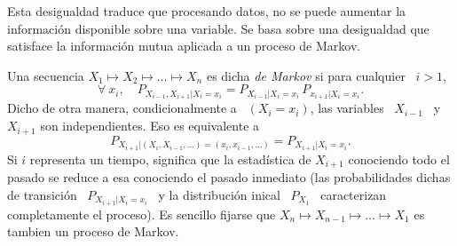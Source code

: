 \label{Sec:SZ:Desigualdades}




\label{Ssec:SZ:ProcDatosShannon}

Esta  desigualdad  traduce  que  procesando  datos,  no  se  puede  aumentar  la
informaci\'on disponible sobre  una variable. Se basa sobre  una desigualdad que
satisface la informaci\'on mutua aplicada a un proceso de Markov.

\begin{definicion}
\label{Def:SZ:ProcesoMarkov}
%
  Una secuencia  $X_1 \mapsto X_2 \mapsto  \ldots \mapsto X_n$ es  dicha {\it de
    Markov}   si   para  cualquier \   $i   >   1$,
  \[
  \forall \: x_i, \quad P_{X_{i-1},X_{i+1}|X_i=x_i} = P_{X_{i-1}|X_i=x_i} \, P_{x_{i+1}|X_i=x_i}.
  \]
  Dicho  de otra  manera,  condicionalmente  a \  $(X_i=x_i)$,  las variables  \
  $X_{i-1}$ \ y \ $X_{i+1}$ son independientes.  Eso es equivalente a
  \[
  P_{X_{i+1}|(X_i,X_{i-1},\ldots)=(x_i,x_{i-1},\ldots)} = P_{X_{i+1}|X_i=x_i}.
  \]
  Si  $i$ representa  un tiempo,  significa  que la  estad\'istica de  $X_{i+1}$
  conociendo todo el pasado se reduce  a esa conociendo el pasado inmediato (las
  probabilidades  dichas   de  transici\'on  \  $P_{X_{i+1}|X_i=x_i}$   \  y  la
  distribuci\'on inical  \ $P_{X_1}$  \ caracterizan completamente  el proceso).
  Es sencillo  fijarse que $X_n \mapsto  X_{n-1} \mapsto \ldots  \mapsto X_1$ es
  tambien un proceso de Markov.
\end{definicion}

